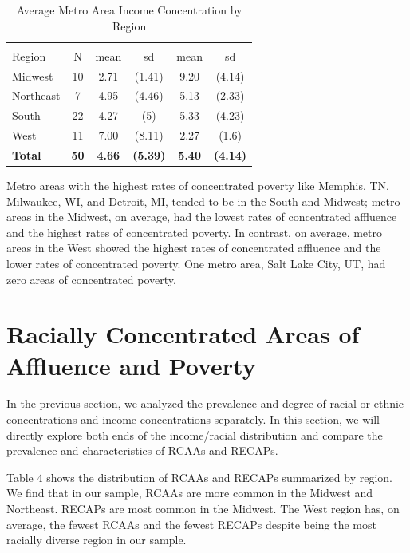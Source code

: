 \documentclass[11pt,]{article}
\begin{document}
\begin{table}[t]

\caption{\label{tab:table3}Average Metro Area Income Concentration by Region}
\centering
\begin{tabular}{lccccc}
\toprule
{} &  &  \\
\cmidrule(l{3pt}r{3pt}){3-4} \cmidrule(l{3pt}r{3pt}){5-6}
Region & N & mean & sd & mean & sd\\
\midrule
Midwest & 10 & 2.71 & (1.41) & 9.20 & (4.14)\\
Northeast & 7 & 4.95 & (4.46) & 5.13 & (2.33)\\
South & 22 & 4.27 & (5) & 5.33 & (4.23)\\
West & 11 & 7.00 & (8.11) & 2.27 & (1.6)\\
\textbf{Total} & \textbf{50} & \textbf{4.66} & \textbf{(5.39)} & \textbf{5.40} & \textbf{(4.14)}\\
\bottomrule
\end{tabular}
\end{table}

Metro areas with the highest rates of concentrated poverty like Memphis,
TN, Milwaukee, WI, and Detroit, MI, tended to be in the South and
Midwest; metro areas in the Midwest, on average, had the lowest rates of
concentrated affluence and the highest rates of concentrated poverty. In
contrast, on average, metro areas in the West showed the highest rates
of concentrated affluence and the lower rates of concentrated poverty.
One metro area, Salt Lake City, UT, had zero areas of concentrated
poverty.

\hypertarget{racially-concentrated-areas-of-affluence-and-poverty}{%
\section{Racially Concentrated Areas of Affluence and
Poverty}\label{racially-concentrated-areas-of-affluence-and-poverty}}

In the previous section, we analyzed the prevalence and degree of racial
or ethnic concentrations and income concentrations separately. In this
section, we will directly explore both ends of the income/racial
distribution and compare the prevalence and characteristics of RCAAs and
RECAPs.

Table 4 shows the distribution of RCAAs and RECAPs summarized by region.
We find that in our sample, RCAAs are more common in the Midwest and
Northeast. RECAPs are most common in the Midwest. The West region has,
on average, the fewest RCAAs and the fewest RECAPs despite being the
most racially diverse region in our sample.
\end{document}
